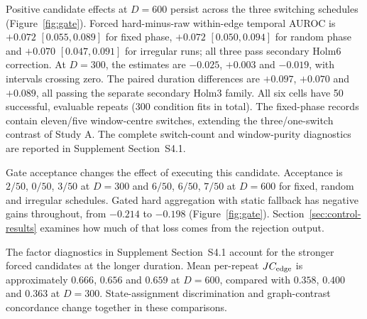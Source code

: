 Positive candidate effects at $D=600$ persist across the three switching
schedules (Figure~\ref{fig:gate}). Forced hard-minus-raw within-edge
temporal AUROC is $+0.072$ $[0.055,0.089]$ for fixed phase, $+0.072$
$[0.050,0.094]$ for random phase and $+0.070$ $[0.047,0.091]$ for
irregular runs; all three pass secondary Holm6 correction. At $D=300$,
the estimates are $-0.025$, $+0.003$ and $-0.019$, with intervals crossing
zero. The paired duration differences are $+0.097$, $+0.070$ and $+0.089$,
all passing the separate secondary Holm3 family. All six cells have 50
successful, evaluable repeats (300 condition fits in total). The fixed-phase records contain eleven/five
window-centre switches, extending the three/one-switch contrast of Study A.
The complete switch-count and window-purity diagnostics are reported in
Supplement Section~S4.1.

Gate acceptance changes the effect of executing this candidate. Acceptance
is $2/50$, $0/50$, $3/50$ at $D=300$ and $6/50$, $6/50$, $7/50$
at $D=600$ for fixed, random and irregular schedules. Gated hard aggregation
with static fallback has negative gains throughout, from $-0.214$ to
$-0.198$ (Figure~\ref{fig:gate}). Section~\ref{sec:control-results} examines
how much of that loss comes from the rejection output.

The factor diagnostics in Supplement Section~S4.1 account for the stronger
forced candidates at the longer duration. Mean per-repeat $JC_{\rm edge}$
is approximately $0.666$, $0.656$ and $0.659$ at $D=600$, compared with
$0.358$, $0.400$ and $0.363$ at $D=300$. State-assignment discrimination
and graph-contrast concordance change together in these comparisons.
